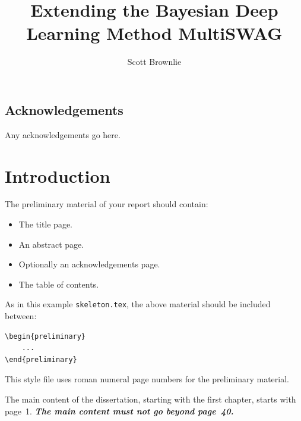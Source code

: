 \documentclass[msc,deptreport.inf]{infthesis} %
\begin{document}
\begin{preliminary}

\title{Extending the Bayesian Deep Learning Method MultiSWAG}

\author{Scott Brownlie}


\maketitle

\section*{Acknowledgements}
Any acknowledgements go here.

\tableofcontents
\end{preliminary}


\chapter{Introduction}

The preliminary material of your report should contain:
\begin{itemize}
\item
The title page.
\item
An abstract page.
\item
Optionally an acknowledgements page.
\item
The table of contents.
\end{itemize}

As in this example \texttt{skeleton.tex}, the above material should be
included between:
\begin{verbatim}
\begin{preliminary}
    ...
\end{preliminary}
\end{verbatim}
This style file uses roman numeral page numbers for the preliminary material.

The main content of the dissertation, starting with the first chapter,
starts with page~1. \emph{\textbf{The main content must not go beyond page~40.}}
\end{document}
